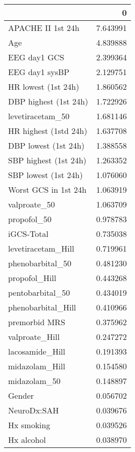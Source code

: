 \begin{tabular}{lr}
\toprule
{} &         0 \\
\midrule
APACHE II 1st 24h              &  7.643991 \\
Age                            &  4.839888 \\
EEG day1 GCS                   &  2.399364 \\
EEG day1 sysBP                 &  2.129751 \\
HR lowest (1st 24h)            &  1.860562 \\
DBP highest (1st 24h)          &  1.722926 \\
levetiracetam\_50               &  1.681146 \\
HR highest (1std 24h)          &  1.637708 \\
DBP lowest (1st 24h)           &  1.388558 \\
SBP highest (1st 24h)          &  1.263352 \\
SBP lowest (1st 24h)           &  1.076060 \\
Worst GCS in 1st 24h           &  1.063919 \\
valproate\_50                   &  1.063709 \\
propofol\_50                    &  0.978783 \\
iGCS-Total                     &  0.735038 \\
levetiracetam\_Hill             &  0.719961 \\
phenobarbital\_50               &  0.481230 \\
propofol\_Hill                  &  0.443268 \\
pentobarbital\_50               &  0.434019 \\
phenobarbital\_Hill             &  0.410966 \\
premorbid MRS                  &  0.375962 \\
valproate\_Hill                 &  0.247272 \\
lacosamide\_Hill                &  0.191393 \\
midazolam\_Hill                 &  0.154580 \\
midazolam\_50                   &  0.148897 \\
Gender                         &  0.056702 \\
NeuroDx:SAH                    &  0.039676 \\
Hx smoking                     &  0.039526 \\
Hx alcohol                     &  0.038970 \\

\end{tabular}
